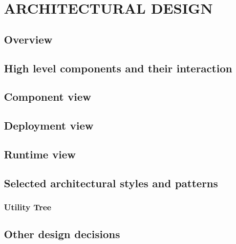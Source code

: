 \section{ARCHITECTURAL DESIGN}

	\subsection{Overview}

	\subsection{High level components and their interaction}

	\subsection{Component view}

	\subsection{Deployment view}

	\subsection{Runtime view}

	\subsection{Selected architectural styles and patterns}

		\subsubsection{Utility Tree}

	\subsection{Other design decisions}
